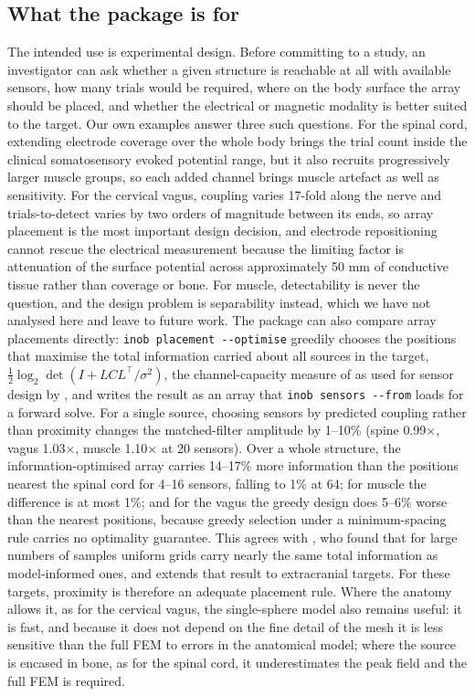 \documentclass[11pt]{article}
\newcommand{\revised}[1]{#1}
\begin{document}
\subsection{What the package is for}\label{what-the-package-is-for}

The intended use is experimental design. Before committing to a study,
an investigator can ask whether a given structure is reachable at all
with available sensors, how many trials would be required, where on the
body surface the array should be placed, and whether the electrical or
magnetic modality is better suited to the target. Our own examples
answer three such questions. For the spinal cord, extending electrode coverage
over the whole body brings the trial count inside the clinical
somatosensory evoked potential range, but it also recruits progressively
larger muscle groups, so each added channel brings muscle artefact as
well as sensitivity. For the cervical vagus, coupling varies
\revised{17-fold} along the nerve and trials-to-detect varies by two orders of
magnitude between its ends, so array placement is the most important
design decision, and electrode repositioning cannot rescue the
electrical measurement because the limiting factor is attenuation of the
surface potential across approximately 50 mm of conductive tissue rather
than coverage or bone. For muscle, detectability is never the question,
and the design problem is separability instead, which we have not
analysed here and leave to future work. The package can also
compare array placements directly\revised{: \texttt{inob placement -\/-optimise}
greedily chooses the positions that maximise the total information
carried about all sources in the target,
\(\tfrac{1}{2}\log_{2}\det(I + LCL^{\top}/\sigma^{2})\), the
channel-capacity measure of \citet{Schneiderman2014} as used for sensor
design by \citet{Iivanainen2021}, and writes the result as an array that
\texttt{inob sensors -\/-from} loads for a forward solve.} \revised{For a single
source, choosing sensors by predicted coupling rather than proximity
changes the matched-filter amplitude by 1--10\% (spine 0.99×, vagus
1.03×, muscle 1.10× at 20 sensors). Over a whole structure, the
information-optimised array carries 14--17\% more information than the
positions nearest the spinal cord for 4--16 sensors, falling to 1\% at
64; for muscle the difference is at most 1\%; and for the vagus the
greedy design does 5--6\% worse than the nearest positions, because
greedy selection under a minimum-spacing rule carries no optimality
guarantee.} \revised{This agrees with
\citet{Iivanainen2021}, who found that for large numbers of samples
uniform grids carry nearly the same total information as model-informed
ones, and extends that result to extracranial targets. For these
targets, proximity is therefore an adequate placement rule.} Where the anatomy
allows it, as for the cervical vagus, the single-sphere model also
remains useful: it is fast, and because it does not depend on the fine
detail of the mesh it is less sensitive than the full FEM to errors in
the anatomical model; where the source is encased in bone, as for the
spinal cord, it underestimates the peak field and the full FEM is
required.
\end{document}
